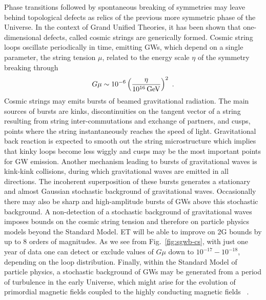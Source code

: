 Phase transitions followed by spontaneous breaking of symmetries may leave behind topological defects as relics of the previous more symmetric phase of the Universe.
In the context of Grand Unified Theories, it has been shown \cite{Jeannerot:2003qv} that one-dimensional defects, called cosmic strings are generically formed. Cosmic string loops oscillate periodically in time, emitting GWs, which depend on a single parameter, the string tension $\mu$, related to the energy scale $\eta$ of the symmetry breaking through
\begin{equation}
G\mu\sim 10^{-6}\left(\frac{\eta}{10^{16}\, {\rm GeV} }  \right)^2~.
\end{equation}
Cosmic strings may emits bursts of beamed gravitational radiation.
The main sources of bursts are kinks, discontinuities on the tangent vector of a string resulting from string inter-commutations and exchange of partners, and cusps, points where the string instantaneously reaches the speed of light. Gravitational back reaction is expected to smooth out the string microstructure which implies that kinky loops become less wiggly and cusps may be the most important points for GW emission. Another mechanism leading to bursts of gravitational waves is kink-kink collisions, during which gravitational waves are emitted in all directions. The incoherent superposition of these bursts generates a stationary and almost Gaussian stochastic background of gravitational waves. Occasionally there may also be sharp and high-amplitude bursts of GWs above this stochastic background. 
A non-detection of a stochastic background of gravitational waves imposes bounds on the cosmic string tension and therefore on  particle physics models beyond the Standard Model.
ET  will be able to improve on 2G bounds by up to 8 orders of magnitudes. As we see from Fig.~\ref{fig:sgwb-cs},  with just one year of data one can detect or exclude values of $G\mu$ down to 
$10^{-17}-10^{-18}$, depending on the loop distribution.
Finally, within the Standard Model of particle physics, a stochastic background of GWs may be generated from a period of turbulence in the early Universe, which might arise for  the evolution of primordial magnetic fields coupled to the highly conducting magnetic fields ~\cite{Gogoberidze:2007an}.


